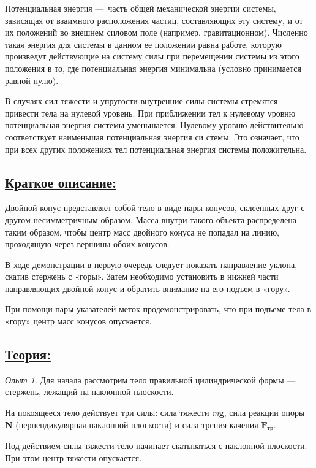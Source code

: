 \documentclass[14pt,a4paper,oneside]{extarticle}	%
\begin{document}
	Потенциальная энергия — часть общей механической энергии системы, зависящая от взаимного расположения частиц, составляющих эту систему, и от их положений во внешнем силовом поле (например, гравитационном).
	Численно такая энергия для системы в данном ее положении равна работе, которую произведут действующие на систему силы при перемещении системы из этого положения в то, где потенциальная энергия минимальна (условно принимается равной нулю).
	
	В случаях сил тяжести и упругости внутренние силы системы стремятся привести тела на нулевой 
	уровень. 
	При приближении тел к нулевому уровню потенциальная энергия системы уменьшается.
	Нулевому уровню действительно соответствует наименьшая потенциальная энергия си	стемы.
	Это означает, что при всех других положениях тел потенциальная энергия системы положительна.

	\subsection*{\underline{Краткое описание:}}
		
		Двойной конус представляет собой тело в виде пары конусов, склеенных друг с другом несимметричным образом.
		Масса внутри такого объекта распределена таким образом, чтобы центр масс двойного конуса не попадал на линию, проходящую через вершины обоих конусов. 
		
		В ходе демонстрации в первую очередь следует показать направление уклона, скатив стержень с «горы».
		Затем необходимо установить в нижней части направляющих двойной конус и обратить внимание на его подъем в «гору».
		
		При помощи пары указателей-меток продемонстрировать, что при подъеме тела в «гору» центр масс конусов опускается.

	\newpage	
		\subsection*{\underline{Теория:}}

	\textit{Опыт 1}. Для начала рассмотрим тело правильной цилиндрической формы  — стержень, лежащий на наклонной плоскости.
	
	На покоящееся тело действует три силы: сила тяжести \textit{m}\textbf{g}, сила реакции опоры \textbf{N} (перпендикулярная наклонной плоскости) и сила трения качения $ \textbf{F}_{\text{тр}} $.
	
	Под действием силы тяжести тело начинает скатываться с наклонной плоскости.
	При этом центр тяжести опускается.
	
\end{document}
